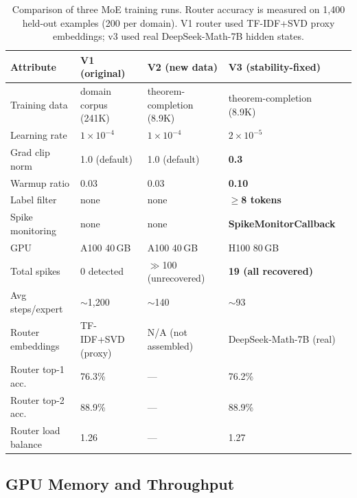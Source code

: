 \documentclass[11pt,a4paper]{article}
\begin{document}
\begin{table}[t]
\centering
\caption{Comparison of three MoE training runs. Router accuracy is measured on 1{,}400 held-out examples (200 per domain). V1 router used TF-IDF+SVD proxy embeddings; v3 used real DeepSeek-Math-7B hidden states.}
\label{tab:moe_versions_compare}
\small
\begin{tabular}{@{}lllll@{}}
\toprule
\textbf{Attribute} & \textbf{V1 (original)} & \textbf{V2 (new data)} & \textbf{V3 (stability-fixed)} \\
\midrule
Training data        & domain corpus (241K) & theorem-completion (8.9K) & theorem-completion (8.9K) \\
Learning rate        & $1\times10^{-4}$     & $1\times10^{-4}$         & $2\times10^{-5}$ \\
Grad clip norm       & 1.0 (default)        & 1.0 (default)            & \textbf{0.3} \\
Warmup ratio         & 0.03                 & 0.03                     & \textbf{0.10} \\
Label filter         & none                 & none                     & \textbf{$\geq$8 tokens} \\
Spike monitoring     & none                 & none                     & \textbf{SpikeMonitorCallback} \\
GPU                  & A100 40\,GB          & A100 40\,GB              & H100 80\,GB \\
Total spikes         & 0 detected           & $\gg$100 (unrecovered)   & \textbf{19 (all recovered)} \\
Avg steps/expert     & $\sim$1{,}200        & $\sim$140                & $\sim$93 \\
Router embeddings    & TF-IDF+SVD (proxy)   & N/A (not assembled)      & DeepSeek-Math-7B (real) \\
Router top-1 acc.    & 76.3\%               & ---                      & 76.2\% \\
Router top-2 acc.    & 88.9\%               & ---                      & 88.9\% \\
Router load balance  & 1.26                 & ---                      & 1.27 \\
\bottomrule
\end{tabular}
\end{table}

\subsection{GPU Memory and Throughput}
\end{document}
